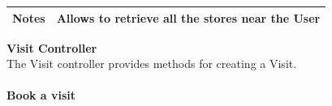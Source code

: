 \documentclass[a4paper, 12pt, oneside, table]{article}
\begin{document}
\begin{tabularx}{\linewidth}{| l | X |}
    \hline
    \textbf{Notes} & Allows to retrieve all the stores near the User \\

    \hline
    
\end{tabularx}

\textbf{\large Visit Controller}\\
The Visit controller provides methods for creating a Visit.\\
\\
\textbf{Book a visit}
\vspace{-2em}
\begin{tabularx}{0.8\textwidth} { 
  | >{\raggedright\arraybackslash}X 
  | >{\centering\arraybackslash}X 
  | >{\raggedleft\arraybackslash}X | }
 \hline

 \hline
 
\hline
\hline
 
\hline
\end{tabularx}
\end{document}

